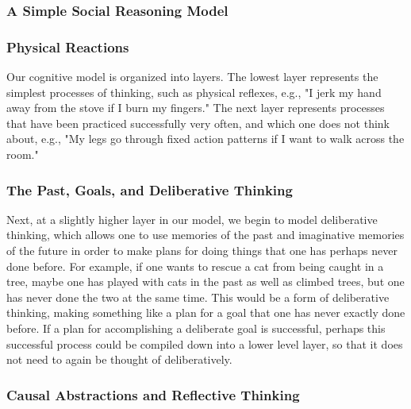 \subsubsection{A Simple Social Reasoning Model}

\subsubsection{Physical Reactions}

Our cognitive model is organized into layers. The lowest layer
represents the simplest processes of thinking, such as physical
reflexes, e.g., "I jerk my hand away from the stove if I burn my
fingers." The next layer represents processes that have been practiced
successfully very often, and which one does not think about, e.g., "My
legs go through fixed action patterns if I want to walk across the
room."

\subsubsection{The Past, Goals, and Deliberative Thinking}

Next, at a slightly higher layer in our model, we begin to model
deliberative thinking, which allows one to use memories of the past
and imaginative memories of the future in order to make plans for
doing things that one has perhaps never done before. For example, if
one wants to rescue a cat from being caught in a tree, maybe one has
played with cats in the past as well as climbed trees, but one has
never done the two at the same time. This would be a form of
deliberative thinking, making something like a plan for a goal that
one has never exactly done before. If a plan for accomplishing a
deliberate goal is successful, perhaps this successful process could
be compiled down into a lower level layer, so that it does not need to
again be thought of deliberatively.

\subsubsection{Causal Abstractions and Reflective Thinking}

